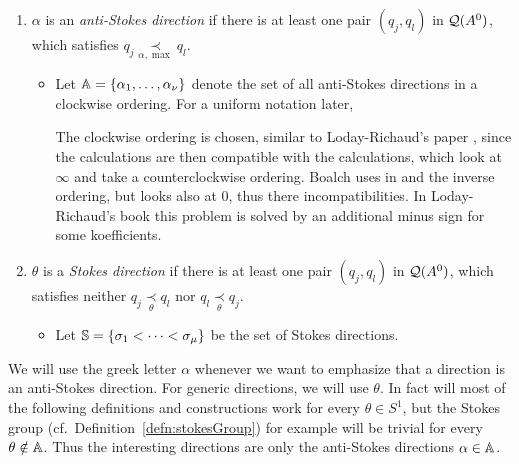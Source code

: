 \begin{defn}\label{defn:antiStokesDir}
  \begin{enumerate}
    \item $\alpha$ is an \emph{anti-Stokes direction} if there is at least one
      pair $(q_j,q_l)$ in $\cQ(A^0)$, which satisfies
      $q_j \underset{\alpha,\max}{\prec} q_l$.
      \begin{itemize}
        \item Let $\A=\{\alpha_1,\dots,\alpha_{\nu}\}$ denote the set of all
          anti-Stokes directions in a clockwise ordering. For a uniform
          notation later, 
          \begin{s-rem}
            The clockwise ordering is chosen, similar to Loday-Richaud's paper
            \cite{Loday1994}, since the calculations are then compatible with
            the calculations, which look at $\infty$ and take a
            counterclockwise ordering.
            Boalch uses in \cite{boalch} and \cite{thboalch} the inverse
            ordering, but looks also at $0$, thus there 
            incompatibilities.
            In Loday-Richaud's book \cite{Loday2014} this problem is solved by
            an additional minus sign for some koefficients.
          \end{s-rem}
      \end{itemize}
    \item $\theta$ is a \emph{Stokes direction} if there is at least one pair
      $(q_j,q_l)$ in $\cQ(A^0)$, which satisfies neither
      $q_j\underset{\theta}{\prec} q_l$ nor $q_l\underset{\theta}{\prec} q_j$.
      \begin{itemize}
        \item Let $\S=\{\sigma_1<\cdots<\sigma_\mu\}$ be the set of Stokes
          directions.
      \end{itemize}
  \end{enumerate}
\end{defn}
We will use the greek letter $\alpha$ whenever we want to emphasize that a
direction is an anti-Stokes direction.
For generic directions, we will use $\theta$.
In fact will most of the following definitions and
constructions work for every $\theta\in S^1$, but the Stokes group
(cf.\ Definition~\ref{defn:stokesGroup}) for example will be trivial
for every $\theta\notin\A$.
Thus the interesting directions are  only the anti-Stokes directions
$\alpha\in\A$.


